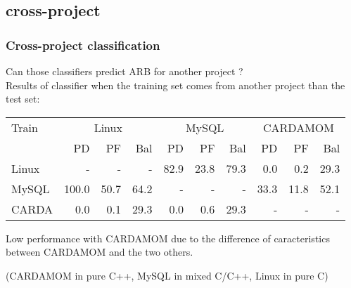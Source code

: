 \subsection{cross-project}
\begin{frame}
 \frametitle{Cross-project classification}
 \alert{Can those classifiers predict ARB for another project ?}\\
 Results of classifier when the training set comes from another project than the test set:
 \begin{center}
 \begin{tabular}{l|r r r|r r r|r r r}
  Train & \multicolumn{3}{c}{Linux} & \multicolumn{3}{c}{MySQL} & \multicolumn{3}{c}{CARDAMOM}\\
  ~ & PD & PF & Bal & PD & PF & Bal & PD & PF & Bal\\
  \hline
  Linux & - & - & - & 82.9 & 23.8 & 79.3 & 0.0 & 0.2 & 29.3\\
  MySQL & 100.0 & 50.7 & 64.2 & - & - & - & 33.3 & 11.8 & 52.1\\
  CARDA & 0.0 & 0.1 & 29.3 & 0.0 & 0.6 & 29.3 & - & - & -\\
  \hline
 \end{tabular}
 \end{center}
 Low performance with CARDAMOM due to the difference of caracteristics between CARDAMOM and the two others.
 \begin{center}
  (CARDAMOM in pure C++, MySQL in mixed C/C++, Linux in pure C)
 \end{center}
\end{frame}
